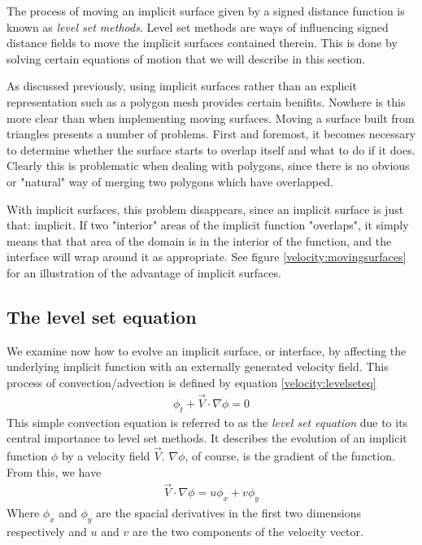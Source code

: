 The process of moving an implicit surface given by a signed distance function is known as \emph{level set methods}. Level set methods are ways of influencing signed distance fields to move the implicit surfaces contained therein. This is done by solving certain equations of motion that we will describe in this section.

As discussed previously, using implicit surfaces rather than an explicit representation such as a polygon mesh provides certain benifits. Nowhere is this more clear than when implementing moving surfaces. Moving a surface built from triangles presents a number of problems. First and foremost, it becomes necessary to determine whether the surface starts to overlap itself and what to do if it does. Clearly this is problematic when dealing with polygons, since there is no obvious or "natural" way of merging two polygons which have overlapped.


With implicit surfaces, this problem disappears, since an implicit surface is just that: implicit. If two "interior" areas of the implicit function "overlaps", it simply means that that area of the domain is in the interior of the function, and the interface will wrap around it as appropriate. See figure \vref{velocity:movingsurfaces} for an illustration of the advantage of implicit surfaces.

\subsection{The level set equation}
We examine now how to evolve an implicit surface, or interface, by affecting the underlying implicit function with an externally generated velocity field. This process of convection/advection is defined by equation \vref{velocity:levelseteq}
\begin{eqnarray}
\label{velocity:levelseteq}
\phi_t + \vec{V}\cdot \nabla \phi = 0
\end{eqnarray}
This simple convection equation is referred to as the \emph{level set equation} due to its central importance to level set methods. It describes the evolution of an implicit function $\phi$ by a velocity field $\vec{V}$. $\nabla \phi$, of course, is the gradient of the function. From this, we have
\begin{eqnarray}
\label{velocity:gradient}
\vec{V}\cdot\nabla\phi = u\phi_x + v\phi_y
\end{eqnarray}
Where $\phi_x$ and $\phi_y$ are the spacial derivatives in the first two
dimensions respectively and $u$ and $v$ are the two components of the
velocity vector.


